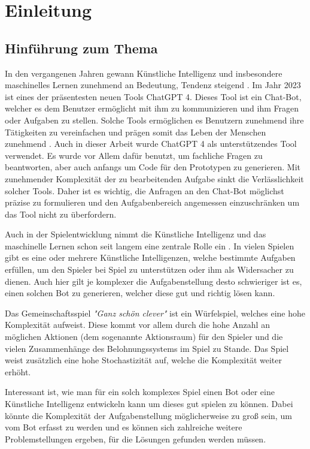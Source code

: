 \section{Einleitung}
\subsection{Hinführung zum Thema}
In den vergangenen Jahren gewann Künstliche Intelligenz und insbesondere maschinelles Lernen zunehmend an Bedeutung, Tendenz steigend \cite{noauthor_kunstliche_nodate,noauthor_maschinelles_2023}. Im Jahr 2023 ist eines der präsentesten neuen Tools ChatGPT 4. Dieses Tool ist ein Chat-Bot, welcher es dem Benutzer ermöglicht mit ihm zu kommunizieren und ihm Fragen oder Aufgaben zu stellen. Solche Tools ermöglichen es Benutzern zunehmend ihre Tätigkeiten zu vereinfachen und prägen somit das Leben der Menschen zunehmend \cite{tagesschaude_chatgpt_nodate}. Auch in dieser Arbeit wurde ChatGPT 4 als unterstützendes Tool verwendet. Es wurde vor Allem dafür benutzt, um fachliche Fragen zu beantworten, aber auch anfangs um Code für den Prototypen zu generieren. Mit zunehmender Komplexität der zu bearbeitenden Aufgabe sinkt die Verlässlichkeit solcher Tools. Daher ist es wichtig, die Anfragen an den Chat-Bot möglichst präzise zu formulieren und den Aufgabenbereich angemessen einzuschränken um das Tool nicht zu überfordern.

Auch in der Spielentwicklung nimmt die Künstliche Intelligenz und das maschinelle Lernen schon seit langem eine zentrale Rolle ein \cite{noauthor_kunstliche_2023}. In vielen Spielen gibt es eine oder mehrere Künstliche Intelligenzen, welche bestimmte Aufgaben erfüllen, um den Spieler bei Spiel zu unterstützen oder ihm als Widersacher zu dienen. Auch hier gilt je komplexer die Aufgabenstellung desto schwieriger ist es, einen solchen Bot zu generieren, welcher diese gut und richtig lösen kann.

Das Gemeinschaftsspiel \textit{"Ganz schön clever"} ist ein Würfelspiel, welches eine hohe Komplexität aufweist. Diese kommt vor allem durch die hohe Anzahl an möglichen Aktionen (dem sogenannte Aktionsraum) für den Spieler und die vielen Zusammenhänge des Belohnungssystems im Spiel zu Stande. Das Spiel weist zusätzlich eine hohe Stochastizität auf, welche die Komplexität weiter erhöht.

Interessant ist, wie man für ein solch komplexes Spiel einen Bot oder eine Künstliche Intelligenz entwickeln kann um dieses gut spielen zu können. Dabei könnte die Komplexität der Aufgabenstellung möglicherweise zu groß sein, um vom Bot erfasst zu werden und es können sich zahlreiche weitere Problemstellungen ergeben, für die Lösungen gefunden werden müssen.
